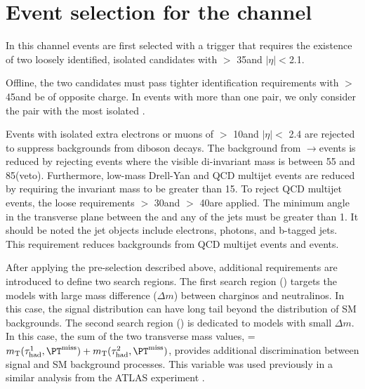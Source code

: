 \section{\texorpdfstring{Event selection for the \tauTau channel}{Event selection for the tau-tau channel}}
\label{sect:tauTauCuts}
In this channel events are first selected with a trigger \cite{Khachatryan:2015hwa,Chatrchyan:2012xi,Chatrchyan:2011nv}
that requires the existence of
two loosely identified, isolated \Tau candidates with \PT $>$ 35\GeV and $|\eta|<$2.1.   

Offline, the two \Tau candidates must pass tighter identification requirements with \PT $>$ 45\GeV and be of opposite charge.
In events with more than one \tauTau pair, we only consider the pair with the most isolated \Tau. 

Events with isolated extra electrons or muons of \PT $>$ 10\GeV and $|\eta| <$ 2.4 
are rejected to suppress %
backgrounds from diboson decays.
The background from \Z$\rightarrow$\tauTau events is reduced by rejecting events where the visible
di-\Tau invariant mass is between 55 and 85\GeV (\Z veto).  Furthermore, 
low-mass Drell-Yan and QCD multijet events are reduced by requiring the invariant mass to be greater than 15\GeV.
To reject QCD multijet events, the loose requirements \MPT $>$ 30\GeV and \mttwo $>$ 40\GeV are applied.
The minimum angle \deltaphi in the transverse plane between the \ptvecmiss and any of the jets must be greater than 1. 
It should be noted the jet objects include electrons, photons, \Tau and b-tagged jets.
This requirement reduces backgrounds from QCD multijet events and \wjets events.

After applying the pre-selection described above,
additional requirements are introduced to define two search regions.
The first search region (\binone) targets the models with large mass difference ($\Delta m$) 
between charginos and neutralinos.
In this case, the \mttwo signal distribution can have long tail beyond the 
distribution of SM backgrounds.
The second search region (\bintwo) is dedicated to models with small $\Delta m$.  
In this case, the sum of the two transverse mass values, \SumMT = $\mt(\Tau^1,\MPT) + \mt(\Tau^2,\MPT)$, 
provides additional discrimination between signal and SM background processes.
This variable was used previously in a similar analysis from the ATLAS experiment \cite{Aad:2014yka}.


